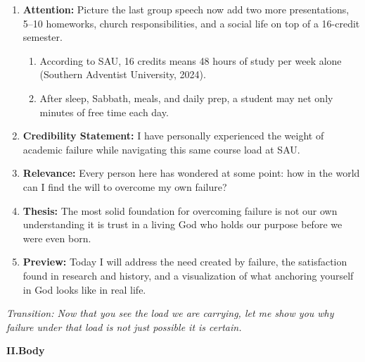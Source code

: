 \documentclass[12pt]{article}
\begin{document}
\begin{enumerate}[label=\Alph*., leftmargin=1.5cm, itemsep=0pt]

  \item \textbf{Attention:} Picture the last group speech now add two more presentations, 5--10 homeworks, church responsibilities, and a social life on top of a 16-credit semester.
    \begin{enumerate}[label=\arabic*., leftmargin=1cm, itemsep=0pt]
      \item According to SAU, 16 credits means 48 hours of study per week alone (Southern Adventist University, 2024).
      \item After sleep, Sabbath, meals, and daily prep, a student may net only minutes of free time each day.
    \end{enumerate}

  \item \textbf{Credibility Statement:} I have personally experienced the weight of academic failure while navigating this same course load at SAU.

  \item \textbf{Relevance:} Every person here has wondered at some point: how in the world can I find the will to overcome my own failure?

  \item \textbf{Thesis:} The most solid foundation for overcoming failure is not our own understanding it is trust in a living God who holds our purpose before we were even born.

  \item \textbf{Preview:} Today I will address the need created by failure, the satisfaction found in research and history, and a visualization of what anchoring yourself in God looks like in real life.

\end{enumerate}

\noindent\textit{Transition: Now that you see the load we are carrying, let me show you why failure under that load is not just possible it is certain.}

\bigskip

\noindent\textbf{II.\quad Body}
\end{document}
